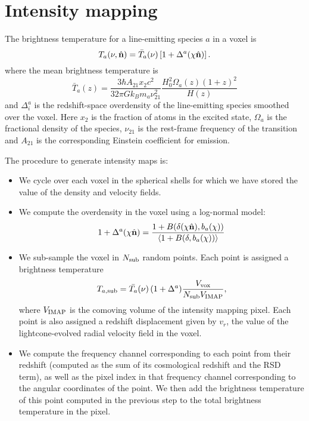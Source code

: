 \documentclass[a4paper,10pt]{article}
\newcommand{\nv}{\hat{\bf n}}
\begin{document}
\section{Intensity mapping}
  The brightness temperature for a line-emitting species $a$ in a voxel is
  \begin{equation}
    T_a(\nu,\hat{\bf n})=\bar{T}_a(\nu)\left[1+\Delta^a(\chi\hat{\bf n})\right].
  \end{equation}
  where the mean brightness temperature is
  \begin{equation}
    \bar{T}_a(z)=\frac{3\hbar A_{21} x_2 c^2}{32\pi G k_B m_a \nu_{21}^2}
    \frac{H_0^2\Omega_{a}(z)(1+z)^2}{H(z)}
  \end{equation}
  and $\Delta^a_i$ is the redshift-space overdensity of the line-emitting species smoothed over the voxel. Here $x_2$ is the fraction of atoms in the excited state, $\Omega_a$ is the fractional density of the species, $\nu_{21}$ is the rest-frame frequency of the transition and $A_{21}$ is the corresponding Einstein coefficient for emission.

  The procedure to generate intensity maps is:
  \begin{itemize}
    \item We cycle over each voxel in the spherical shells for which we have stored the value of the density and velocity fields.
    \item We compute the overdensity in the voxel using a log-normal model:
      \begin{equation}
        1+\Delta^a(\chi\nv)=\frac{1+B(\delta(\chi\nv),b_a(\chi))}{\langle1+B(\delta,b_a(\chi))\rangle}
      \end{equation}
    \item We sub-sample the voxel in $N_{\rm sub}$ random points. Each point is assigned a brightness temperature
      \begin{equation}
        T_{a,{\rm sub}}=\bar{T_a}(\nu)\,(1+\Delta^a)\frac{V_{\rm vox}}{N_{\rm sub}V_{\rm IMAP}},
      \end{equation}
    where $V_{\rm IMAP}$ is the comoving volume of the intensity mapping pixel. Each point is also assigned a redshift displacement given by $v_r$, the value of the lightcone-evolved radial velocity field in the voxel.
    \item We compute the frequency channel corresponding to each point from their redshift (computed as the sum of its cosmological redshift and the RSD term), as well as the pixel index in that frequency channel corresponding to the angular coordinates of the point. We then add the brightness temperature of this point computed in the previous step to the total brightness temperature in the pixel.
  \end{itemize}
  
\end{document}
